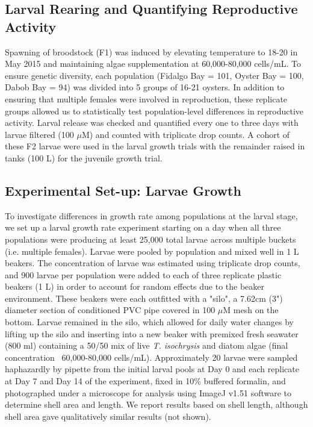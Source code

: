 \documentclass[fleqn,10pt]{wlscirep}
\begin{document}
\subsection*{Larval Rearing and Quantifying Reproductive Activity}
Spawning of broodstock (F1) was induced by elevating temperature to 18-20  in May 2015 and maintaining algae supplementation at 60,000-80,000 cells/mL. To ensure genetic diversity, each population (Fidalgo Bay = 101, Oyster Bay = 100, Dabob Bay = 94) was divided into 5 groups of 16-21 oysters. In addition to ensuring that multiple females were involved in reproduction, these replicate groups allowed us to statistically test population-level differences in reproductive activity. Larval release was checked and quantified every one to three days with larvae filtered (100 $\mu$M) and counted with triplicate drop counts. A cohort of these F2 larvae were used in the larval growth trials with the remainder raised in tanks (100 L) for the juvenile growth trial. 

\subsection*{Experimental Set-up: Larvae Growth}
To investigate differences in growth rate among populations at the larval stage, we set up a larval growth rate experiment starting on a day when all three populations were producing at least 25,000 total larvae across multiple buckets (i.e. multiple females). Larvae were pooled by population and mixed well in 1 L beakers. The concentration of larvae was estimated using triplicate drop counts, and 900 larvae per population were added to each of three replicate plastic beakers (1 L) in order to account for random effects due to the beaker environment. These beakers were each outfitted with a "silo", a 7.62cm (3") diameter section of conditioned PVC pipe covered in 100 $\mu$M mesh on the bottom. Larvae remained in the silo, which allowed for daily water changes by lifting up the silo and inserting into a new beaker with premixed fresh seawater (800 ml) containing a 50/50 mix of live \textit{T. isochrysis} and diatom algae (final concentration ~60,000-80,000 cells/mL). Approximately 20 larvae were sampled haphazardly by pipette from the initial larval pools at Day 0 and each replicate at Day 7 and Day 14 of the experiment, fixed in 10\% buffered formalin, and photographed under a microscope for analysis using ImageJ v1.51\cite{Schneider2012-js} software to determine shell area and length. We report results based on shell length, although shell area gave qualitatively similar results (not shown).
\end{document}
